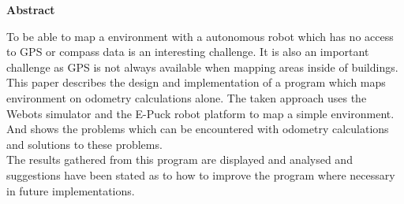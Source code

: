 \thispagestyle{empty}

\begin{center}
    {\LARGE\bf Abstract}
\end{center}

To be able to map a environment with a autonomous robot which has no access to GPS or compass data is an interesting challenge. 
It is also an important challenge as GPS is not always available when mapping areas inside of buildings. \\
This paper describes the design and implementation of a program which maps environment on odometry calculations alone. 
The taken approach uses the Webots\textsuperscript{\texttrademark}  simulator and the E-Puck robot platform to map a simple environment. And shows the problems which can be encountered with odometry calculations and solutions to these problems. \\
The results gathered from this program are displayed and analysed and suggestions have been stated as to how to improve the program where necessary in future implementations. 
